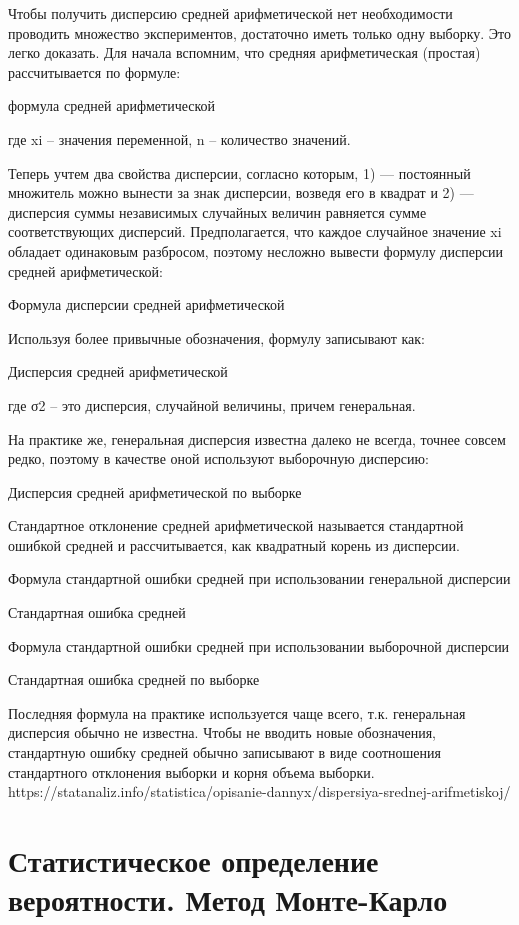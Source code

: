 \documentclass[14pt,a4paper]{article}
\begin{document}
Чтобы получить дисперсию средней арифметической нет необходимости проводить множество экспериментов, достаточно иметь только одну выборку. Это легко доказать. Для начала вспомним, что средняя арифметическая (простая) рассчитывается по формуле:

формула средней арифметической

где xi – значения переменной,
n – количество значений.

Теперь учтем два свойства дисперсии, согласно которым, 1) — постоянный множитель можно вынести за знак дисперсии, возведя его в квадрат и 2) — дисперсия суммы независимых случайных величин равняется сумме соответствующих дисперсий. Предполагается, что каждое случайное значение xi обладает одинаковым разбросом, поэтому несложно вывести формулу дисперсии средней арифметической:

Формула дисперсии средней арифметической

Используя более привычные обозначения, формулу записывают как:

Дисперсия средней арифметической

где σ2 – это дисперсия, случайной величины, причем генеральная.

На практике же, генеральная дисперсия известна далеко не всегда, точнее совсем редко, поэтому в качестве оной используют выборочную дисперсию:

Дисперсия средней арифметической по выборке

Стандартное отклонение средней арифметической называется стандартной ошибкой средней и рассчитывается, как квадратный корень из дисперсии.

Формула стандартной ошибки средней при использовании генеральной дисперсии

Стандартная ошибка средней

Формула стандартной ошибки средней при использовании выборочной дисперсии

Стандартная ошибка средней по выборке

Последняя формула на практике используется чаще всего, т.к. генеральная дисперсия обычно не известна. Чтобы не вводить новые обозначения, стандартную ошибку средней обычно записывают в виде соотношения стандартного отклонения выборки и корня объема выборки.
https://statanaliz.info/statistica/opisanie-dannyx/dispersiya-srednej-arifmetiskoj/
\section{Статистическое определение вероятности. Метод Монте-Карло}
\end{document}
